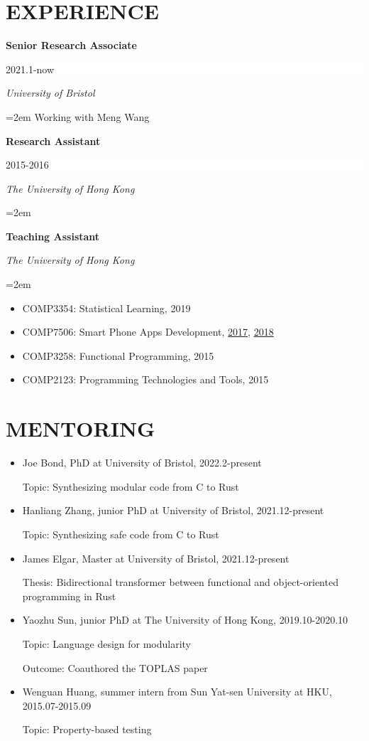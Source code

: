 \documentclass[paper=letter,fontsize=11pt]{scrartcl} %
\newcommand{\sepspace}{\vspace*{1em}}		%
\newcommand{\NewPart}[2]{\section*{\uppercase{#1} #2}}
\newcommand{\EducationEntry}[4]{
		\noindent \textbf{#1} \hfill      %
		\colorbox{White}{%
			\parbox{6em}{%
			\hfill\color{Black}#2}} \par  %
		\noindent \textit{#3} \par        %
		\noindent\hangindent=2em\hangafter=0 \small #4 %
		\normalsize \par}
\begin{document}
\NewPart{Experience}{}
\EducationEntry{Senior Research Associate}{2021.1-now}{University of Bristol}{Working with Meng Wang}
\EducationEntry{Research Assistant}{2015-2016}{The University of Hong Kong}{}
\EducationEntry{Teaching Assistant}{}{The University of Hong Kong}
{\begin{itemize}
\item{COMP3354: Statistical Learning, 2019}
\item{COMP7506: Smart Phone Apps Development, \href{https://msccs.cs.hku.hk/public/courses/2017/COMP7506A}{2017}, \href{https://msccs.cs.hku.hk/public/courses/2018/COMP7506A}{2018}}
\item{COMP3258: Functional Programming, 2015}
\item{COMP2123: Programming Technologies and Tools, 2015}
\end{itemize}}
\sepspace

\NewPart{Mentoring}{}
\begin{itemize}

\item Joe Bond, PhD at University of Bristol, 2022.2-present

  Topic: Synthesizing modular code from C to Rust

\item Hanliang Zhang, junior PhD at University of Bristol, 2021.12-present

  Topic: Synthesizing safe code from C to Rust
	
\item James Elgar, Master at University of Bristol, 2021.12-present

  Thesis: Bidirectional transformer between functional and object-oriented programming in Rust

\item Yaozhu Sun, junior PhD at The University of Hong Kong, 2019.10-2020.10

  Topic: Language design for modularity

  Outcome: Coauthored the TOPLAS paper

\item Wenguan Huang, summer intern from Sun Yat-sen University at HKU, 2015.07-2015.09

  Topic: Property-based testing

\end{itemize}
\end{document}
